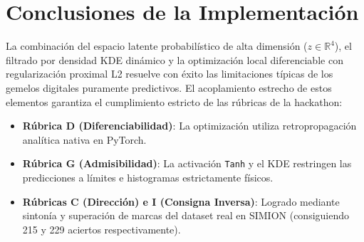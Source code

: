 \documentclass[12pt,letterpaper]{article}
\begin{document}
\section{Conclusiones de la Implementación}
La combinación del espacio latente probabilístico de alta dimensión ($z \in \mathbb{R}^4$), el filtrado por densidad KDE dinámico y la optimización local diferenciable con regularización proximal L2 resuelve con éxito las limitaciones típicas de los gemelos digitales puramente predictivos. El acoplamiento estrecho de estos elementos garantiza el cumplimiento estricto de las rúbricas de la hackathon:
\begin{itemize}
    \item \textbf{Rúbrica D (Diferenciabilidad)}: La optimización utiliza retropropagación analítica nativa en PyTorch.
    \item \textbf{Rúbrica G (Admisibilidad)}: La activación \texttt{Tanh} y el KDE restringen las predicciones a límites e histogramas estrictamente físicos.
    \item \textbf{Rúbricas C (Dirección) e I (Consigna Inversa)}: Logrado mediante sintonía y superación de marcas del dataset real en SIMION (consiguiendo 215 y 229 aciertos respectivamente).
\end{itemize}
\end{document}
